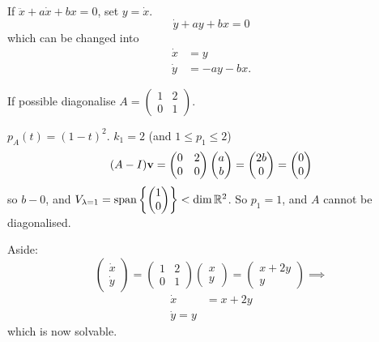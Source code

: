 \documentclass[10pt, a4paper]{article}
\begin{document}
\begin{remark}
    If $\ddot{x} + a\dot{x} + bx = 0$,
    set $y = \dot{x}$.
    \[
    \dot{y} + ay + bx = 0
    \]
    which can be changed into
    \begin{align*}
        \dot{x} &= y \\
        \dot{y} &= -ay - bx.
    \end{align*}
\end{remark}

\begin{example}
    If possible diagonalise $A = \begin{pmatrix}
        1 & 2 \\ 0 & 1
    \end{pmatrix}$.
    \begin{solution}
        $p_A(t) = (1 - t) ^ 2$.
        $k_1 = 2$
        (and $1 \leq p_1 \leq 2$)
        \[
        (A - I)\mathbf{v} = \begin{pmatrix}
            0 & 2 \\ 0 & 0
        \end{pmatrix}\begin{pmatrix}
            a \\ b
        \end{pmatrix}
        = \begin{pmatrix}
            2b \\ 0
        \end{pmatrix} = \begin{pmatrix}
            0 \\ 0
        \end{pmatrix}
        \]
        so $b - 0$,
        and $V_{\lambda = 1} = \mathrm{span}\left\{\begin{pmatrix}
            1 \\ 0
        \end{pmatrix}\right\} < \dim{\mathbb{R}^ 2}$.
        So $p_1 = 1$,
        and $A$ cannot be diagonalised.
    \end{solution}

    Aside:
    \[
    \begin{pmatrix}
        \dot{x} \\ \dot{y}
    \end{pmatrix} = \begin{pmatrix}
        1 & 2 \\ 0 & 1
    \end{pmatrix}\begin{pmatrix}
        x \\ y
    \end{pmatrix} = \begin{pmatrix}
        x + 2y \\ y
    \end{pmatrix}
    \implies
    \]
    \begin{align*}
        \dot{x} &= x + 2y \\
        \dot{y} = y
    \end{align*}
    which is now solvable.
\end{example}
\end{document}
